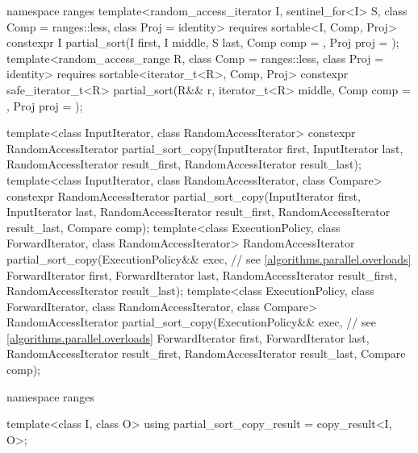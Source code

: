 \begin{codeblock}
{  namespace ranges {
    template<random_access_iterator I, sentinel_for<I> S, class Comp = ranges::less,
             class Proj = identity>
      requires sortable<I, Comp, Proj>
      constexpr I
        partial_sort(I first, I middle, S last, Comp comp = {}, Proj proj = {});
    template<random_access_range R, class Comp = ranges::less, class Proj = identity>
      requires sortable<iterator_t<R>, Comp, Proj>
      constexpr safe_iterator_t<R>
        partial_sort(R&& r, iterator_t<R> middle, Comp comp = {},
                     Proj proj = {});
  }

  template<class InputIterator, class RandomAccessIterator>
    constexpr RandomAccessIterator
      partial_sort_copy(InputIterator first, InputIterator last,
                        RandomAccessIterator result_first,
                        RandomAccessIterator result_last);
  template<class InputIterator, class RandomAccessIterator, class Compare>
    constexpr RandomAccessIterator
      partial_sort_copy(InputIterator first, InputIterator last,
                        RandomAccessIterator result_first,
                        RandomAccessIterator result_last,
                        Compare comp);
  template<class ExecutionPolicy, class ForwardIterator, class RandomAccessIterator>
    RandomAccessIterator
      partial_sort_copy(ExecutionPolicy&& exec,                 // see \ref{algorithms.parallel.overloads}
                        ForwardIterator first, ForwardIterator last,
                        RandomAccessIterator result_first,
                        RandomAccessIterator result_last);
  template<class ExecutionPolicy, class ForwardIterator, class RandomAccessIterator,
           class Compare>
    RandomAccessIterator
      partial_sort_copy(ExecutionPolicy&& exec,                 // see \ref{algorithms.parallel.overloads}
                        ForwardIterator first, ForwardIterator last,
                        RandomAccessIterator result_first,
                        RandomAccessIterator result_last,
                        Compare comp);

  namespace ranges {
    template<class I, class O> using partial_sort_copy_result = copy_result<I, O>;

}}
\end{codeblock}
